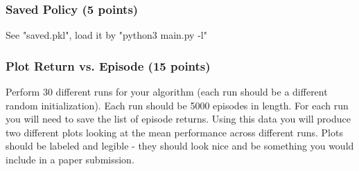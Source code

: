 \documentclass{article}
\begin{document}
\subsubsection{Saved Policy (5 points)}

See "saved.pkl", load it by "python3 main.py -l"

\subsubsection{Plot Return vs. Episode (15 points)}

Perform 30 different runs for your algorithm (each run should be a different random initialization). Each run should be 5000 episodes in length. For each run you will need to save the list of episode returns. Using this data you will produce two different plots looking at the mean performance across different runs. Plots should be labeled and legible - they should look nice and be something you would include in a paper submission.
\end{document}
